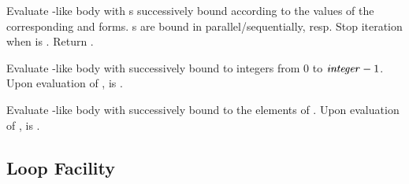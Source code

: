 \begin{LIST}{1cm}
  
  {
  Evaluate -like body with s successively bound according
  to the values of the corresponding  and 
  forms. s are bound in parallel/sequentially, resp.
  Stop iteration when  is \T. Return .
  }

  {
  Evaluate -like body with  successively bound
  to integers from 0 to $\mbox{\VAR{integer}} - 1$. Upon evaluation of
  ,  is \NIL.
  }

  {
  Evaluate -like body with  successively bound
  to the elements of . Upon evaluation of
  ,  is \NIL.
  }


\end{LIST}

\subsection{Loop Facility}

